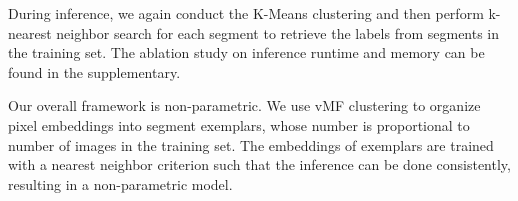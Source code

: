\documentclass[10pt,twocolumn,letterpaper]{article}
\begin{document}
During inference, we again conduct the K-Means clustering and then perform k-nearest neighbor search for each segment to retrieve the labels from segments in the training set.
The ablation study on inference runtime and memory can be found in the supplementary.



Our overall framework is non-parametric. We use vMF clustering to organize pixel embeddings into segment exemplars, whose number is proportional to number of images in the training set. The embeddings of exemplars are trained with a nearest neighbor criterion such that the inference can be done consistently, resulting in a non-parametric model.


 
\begin{table}[b]
  \centering
    \vspace{0.5pt}
    \caption{Quantitative results on Pascal VOC 2012. The first 4 rows with gray colored background are on validation set while the last 4 rows are on testing set. Networks trained with SegSort consistently outperform their parametric counterpart (Softmax) by 1.63 to 2.43\% in mIoU and by 4.07 to 7.97\% in boundary f-measure.}
    \label{tab:voc}
\end{table}
\end{document}
